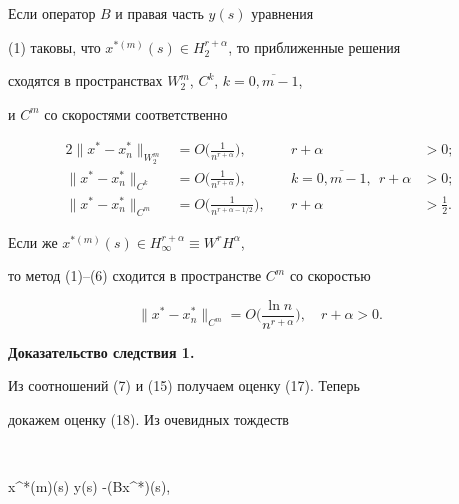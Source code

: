 \begin{cor}


Если оператор $B$ и правая часть $y(s)$ уравнения


(1) таковы, что $x^{*(m)}(s) \in H_2^{r+ \alpha }$, то приближенные решения


сходятся в пространствах $W_2^m$, $C^k$, $k=\overline{0,m-1}$,


и $C^m$ со скоростями соответственно


\begin{alignat}{2}


\| x^* - x_n^* \|_{W_2^m} &=O\bigg( \frac{1}{n^{r+ \alpha }}\bigg),


& \quad r+ \alpha &> 0;\\


%


\| x^* - x_n^* \|_{C^k} &=O\bigg( \frac{1}{n^{r+ \alpha}}\bigg),


& \quad k=\overline{0,m-1}, \ \ r + \alpha &> 0;\\


%


\| x^* - x_n^* \|_{C^m} &=O\bigg( \frac{1}{n^{r+ \alpha - 1/2}}\bigg),


& \quad r+\alpha &> \frac{1}{2}.


\end{alignat}


Если же $x^{*(m)}(s) \in H_{\infty}^{r+ \alpha } \equiv W^r H^{\alpha }$,


то метод (1)--(6) сходится в пространстве $C^m$ со скоростью


\begin{equation}


\| x^* - x_n^* \|_{C^m}=O\bigg( \frac{\ln n}{n^{r+ \alpha }}\bigg), \quad


r+ \alpha > 0.


\end{equation}


\end{cor}








{\bf Доказательство следствия 1.}


Из соотношений (7) и (15) получаем оценку (17). Теперь


докажем оценку (18). Из очевидных тождеств


$$


x^{*(m)}(s) \equiv y(s) -(Bx^*)(s),


